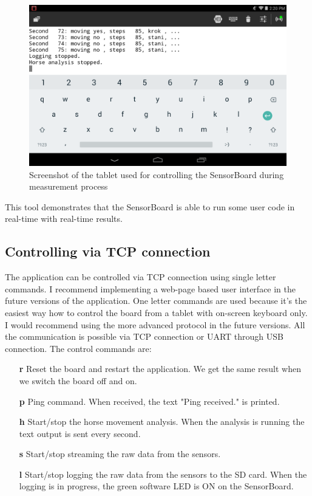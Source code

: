 \begin{figure}
    \centering
    \label{fig:HorseAnalysisTablet}
    \caption{Screenshot of the tablet used for controlling the SensorBoard during measurement process}
    \includegraphics[width=\linewidth]{img/HorseAnalysisTablet.png}
\end{figure}

This tool demonstrates that the SensorBoard is able to run some user code in real-time with real-time results.

\subsection{Controlling via \ac{TCP} connection}
The application can be controlled via \ac{TCP} connection using single letter commands. I recommend implementing a web-page based user interface in the future versions of the application. One letter commands are used because it's the easiest way how to control the board from a tablet with on-screen keyboard only. I would recommend using the more advanced protocol in the future versions. All the communication is possible via \ac{TCP} connection or UART through USB connection. The control commands are:

\begin{itemize}
    \item[\textbf{r}] Reset the board and restart the application. We get the same result when we switch the board off and on.
    \item[\textbf{p}] Ping command. When received, the text "Ping received." is printed.
    \item[\textbf{h}] Start/stop the horse movement analysis. When the analysis is running the text output is sent every second.
    \item[\textbf{s}] Start/stop streaming the raw data from the sensors.
    \item[\textbf{l}] Start/stop logging the raw data from the sensors to the SD card. When the logging is in progress, the green software LED is ON on the SensorBoard.
\end{itemize}


